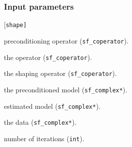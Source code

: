 \subsubsection*{Input parameters}
\begin{desclist}{\tt }{\quad}[\tt shape]
   \setlength\itemsep{0pt}
   \item[prec]  preconditioning operator (\texttt{sf\_coperator}).  
   \item[oper]  the operator (\texttt{sf\_coperator}).  
   \item[shape] the shaping operator (\texttt{sf\_coperator}).  
   \item[p]     the preconditioned model (\texttt{sf\_complex*}).  
   \item[x]     estimated model  (\texttt{sf\_complex*}).  
   \item[dat]   the data (\texttt{sf\_complex*}).  
   \item[niter] number of iterations (\texttt{int}).  
\end{desclist}


